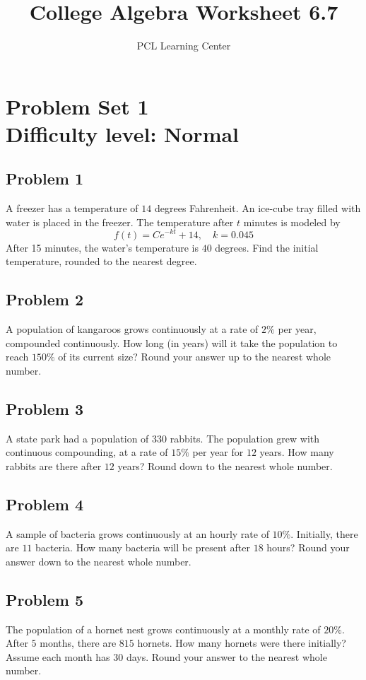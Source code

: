 \documentclass[12pt]{article}
\title{College Algebra Worksheet 6.7}
\author{PCL Learning Center}
\date{}
\begin{document}
\maketitle

\section*{Problem Set 1\\Difficulty level: Normal}

\subsection*{Problem 1}
A freezer has a temperature of \(14\) degrees Fahrenheit. An ice-cube tray filled with water is placed in the freezer. The temperature after \(t\) minutes is modeled by
\[
f(t)=Ce^{-kt}+14,\quad k=0.045
\]
After 15 minutes, the water's temperature is \(40\) degrees. Find the initial temperature, rounded to the nearest degree.

\subsection*{Problem 2}
A population of kangaroos grows continuously at a rate of \(2\%\) per year, compounded continuously. How long (in years) will it take the population to reach \(150\%\) of its current size? Round your answer up to the nearest whole number.

\subsection*{Problem 3}
A state park had a population of \(330\) rabbits. The population grew with continuous compounding, at a rate of \(15\%\) per year for \(12\) years. How many rabbits are there after \(12\) years? Round down to the nearest whole number.

\subsection*{Problem 4}
A sample of bacteria grows continuously at an hourly rate of \(10\%\). Initially, there are \(11\) bacteria. How many bacteria will be present after \(18\) hours? Round your answer down to the nearest whole number.

\subsection*{Problem 5}
The population of a hornet nest grows continuously at a monthly rate of \(20\%\). After \(5\) months, there are \(815\) hornets. How many hornets were there initially? Assume each month has \(30\) days. Round your answer to the nearest whole number.
\end{document}

